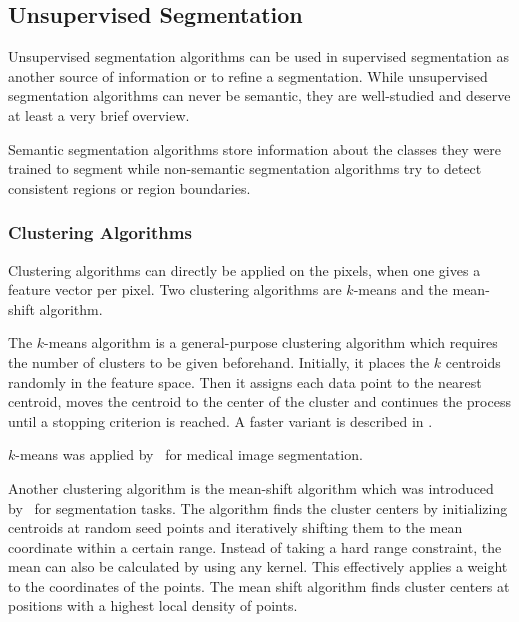 
\subsection{Unsupervised Segmentation}%
\label{subsec:unsupervised-traditional-segmentation}%

Unsupervised segmentation algorithms can be used in supervised segmentation as
another source of information or to refine a segmentation. While unsupervised
segmentation algorithms can never be semantic, they are well-studied and
deserve at least a very brief overview.

Semantic segmentation algorithms store information about the classes they were
trained to segment while non-semantic segmentation algorithms try to detect
consistent regions or region boundaries.


\subsubsection{Clustering Algorithms}
Clustering algorithms can directly be applied on the pixels, when one gives
a feature vector per pixel. Two clustering algorithms are $k$-means and the
mean-shift algorithm.

The $k$-means algorithm is a general-purpose clustering algorithm which
requires the number of clusters to be given beforehand. Initially, it places
the $k$ centroids randomly in the feature space. Then it assigns each
data point to the nearest centroid, moves the centroid to the center of the
cluster and continues the process until a stopping criterion is reached. A
faster variant is described in \cite{hartigan1975clustering}.

$k$-means was applied by~\cite{chen1998image} for medical image segmentation.

Another clustering algorithm is the mean-shift algorithm which was introduced
by~\cite{comaniciu2002mean} for segmentation tasks. The algorithm finds the
cluster centers by initializing centroids at random seed points and iteratively
shifting them to the mean coordinate within a certain range. Instead of taking
a hard range constraint, the mean can also be calculated by using any kernel.
This effectively applies a weight to the coordinates of the points. The mean
shift algorithm finds cluster centers at positions with a highest local
density of points.


